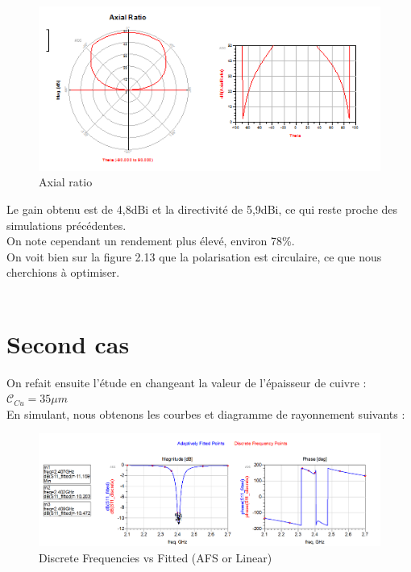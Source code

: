 \documentclass[16pt,a4paper,oneside,titlepage]{report}
\begin{document}
\begin{figure}[h]
\center
\includegraphics[scale=0.55]{Images/P3_Q9-BON22.png}
\caption{Axial ratio}
\end{figure}

Le gain obtenu est de 4,8dBi et la directivité de 5,9dBi, ce qui reste proche des simulations précédentes. \\
On note cependant un rendement plus élevé, environ 78\%.\\
On voit bien sur la figure 2.13 que la polarisation est circulaire, ce que nous cherchions à optimiser.\\\\



\clearpage
\section{Second cas}

On refait ensuite l'étude en changeant la valeur de l'épaisseur de cuivre : $\mathcal{C}_{Cu} =35\mu m$\\

En simulant, nous obtenons les courbes et diagramme de rayonnement suivants :
\begin{figure}[h]
\center
\includegraphics[scale=0.5]{Images/P3_Q10-1.png}
\caption{Discrete Frequencies vs Fitted (AFS or Linear)}
\end{figure}
\end{document}
